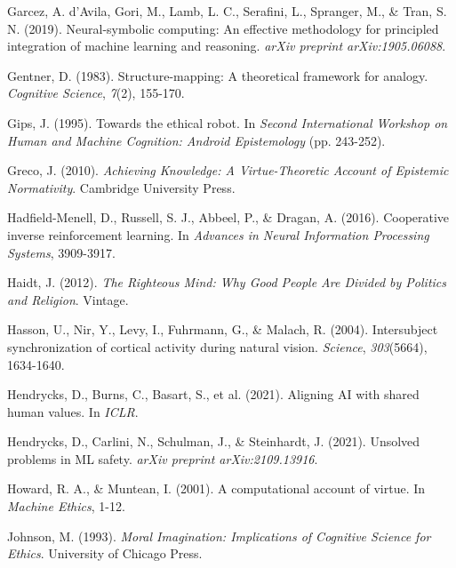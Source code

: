 \documentclass[12pt]{article}
\begin{document}
\begin{thebibliography}{99}
Garcez, A. d'Avila, Gori, M., Lamb, L. C., Serafini, L., Spranger, M., \& Tran, S. N. (2019). Neural-symbolic computing: An effective methodology for principled integration of machine learning and reasoning. \textit{arXiv preprint arXiv:1905.06088}.

Gentner, D. (1983). Structure-mapping: A theoretical framework for analogy. \textit{Cognitive Science}, \textit{7}(2), 155-170.

Gips, J. (1995). Towards the ethical robot. In \textit{Second International Workshop on Human and Machine Cognition: Android Epistemology} (pp. 243-252).

Greco, J. (2010). \textit{Achieving Knowledge: A Virtue-Theoretic Account of Epistemic Normativity}. Cambridge University Press.

Hadfield-Menell, D., Russell, S. J., Abbeel, P., \& Dragan, A. (2016). Cooperative inverse reinforcement learning. In \textit{Advances in Neural Information Processing Systems}, 3909-3917.

Haidt, J. (2012). \textit{The Righteous Mind: Why Good People Are Divided by Politics and Religion}. Vintage.

Hasson, U., Nir, Y., Levy, I., Fuhrmann, G., \& Malach, R. (2004). Intersubject synchronization of cortical activity during natural vision. \textit{Science}, \textit{303}(5664), 1634-1640.

Hendrycks, D., Burns, C., Basart, S., et al. (2021). Aligning AI with shared human values. In \textit{ICLR}.

Hendrycks, D., Carlini, N., Schulman, J., \& Steinhardt, J. (2021). Unsolved problems in ML safety. \textit{arXiv preprint arXiv:2109.13916}.

Howard, R. A., \& Muntean, I. (2001). A computational account of virtue. In \textit{Machine Ethics}, 1-12.

Johnson, M. (1993). \textit{Moral Imagination: Implications of Cognitive Science for Ethics}. University of Chicago Press.


\end{thebibliography}
\end{document}
